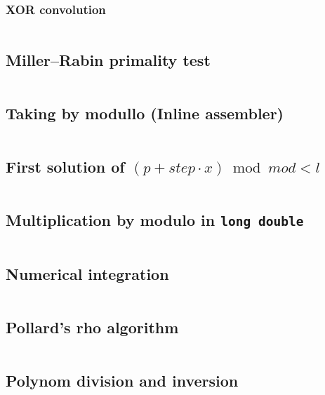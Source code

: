 \documentclass{article}
\begin{document}
\subsubsection{XOR convolution}
\inputminted[mathescape, breaklines, breakafter=(, tabsize=2, frame=lines, showtabs, tab=|\ , tabcolor=lightgray]{c++}{./numeric/convolutions/xor-conv/xor-conv.cpp}
\subsection{Miller–Rabin primality test}
\inputminted[mathescape, breaklines, breakafter=(, tabsize=2, frame=lines, showtabs, tab=|\ , tabcolor=lightgray]{c++}{./numeric/miller-rabin/miller-rabin.cpp}
\subsection{Taking by modullo (Inline assembler)}
\inputminted[mathescape, breaklines, breakafter=(, tabsize=2, frame=lines, showtabs, tab=|\ , tabcolor=lightgray]{c++}{./numeric/mod-asm/mod-asm.cpp}
\subsection{First solution of $(p + step \cdot x) \bmod mod < l$}
\inputminted[mathescape, breaklines, breakafter=(, tabsize=2, frame=lines, showtabs, tab=|\ , tabcolor=lightgray]{c++}{./numeric/mod-ineq-first-sol/mod-ineq-first-sol.cpp}
\subsection{Multiplication by modulo in \texttt{long double}}
\inputminted[mathescape, breaklines, breakafter=(, tabsize=2, frame=lines, showtabs, tab=|\ , tabcolor=lightgray]{c++}{./numeric/mult-by-mod/mult-by-mod.cpp}
\subsection{Numerical integration}
\inputminted[mathescape, breaklines, breakafter=(, tabsize=2, frame=lines, showtabs, tab=|\ , tabcolor=lightgray]{c++}{./numeric/numerical-integration/numerical-integration.cpp}
\subsection{Pollard's rho algorithm}
\inputminted[mathescape, breaklines, breakafter=(, tabsize=2, frame=lines, showtabs, tab=|\ , tabcolor=lightgray]{c++}{./numeric/pollard/pollard.cpp}
\subsection{Polynom division and inversion}
\inputminted[mathescape, breaklines, breakafter=(, tabsize=2, frame=lines, showtabs, tab=|\ , tabcolor=lightgray]{c++}{./numeric/polynom-division/polynom-division.cpp}
\end{document}

